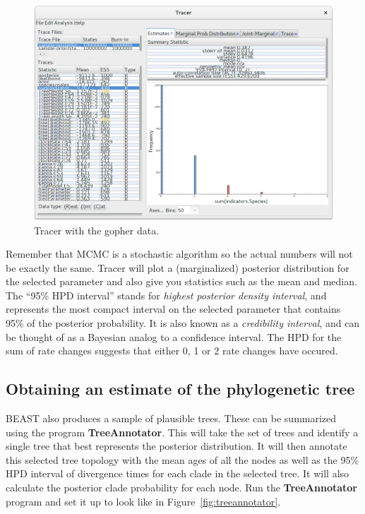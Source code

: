 \documentclass{article}
\begin{document}
\begin{figure}[htb!]
\centering
\includegraphics[width=\textwidth]{figures/tracer-posterior.png}
\caption{Tracer with the gopher data.}
\label{fig:tracer}
\end{figure}

Remember that MCMC is a stochastic algorithm so the actual numbers will not be
exactly the same. Tracer will plot a (marginalized) posterior distribution for
the selected parameter and also give you statistics such as the mean and median.
The ``95\% HPD interval'' stands for \textit{highest posterior density
interval}, and represents the most compact interval on the selected parameter
that contains 95\% of the posterior probability. It is also known as a
\textit{credibility interval}, and can be thought of as a Bayesian analog to a
confidence interval. The HPD for the sum of rate changes suggests that either 0,
1 or 2 rate changes have occured.

\subsection*{Obtaining an estimate of the phylogenetic tree}

BEAST also produces a sample of plausible trees. These can be summarized using
the program \textbf{TreeAnnotator}. This will take the set of trees and identify
a single tree that best represents the posterior distribution. It will then
annotate this selected tree topology with the mean ages of all the nodes as well
as the 95\% HPD interval of divergence times for each clade in the selected
tree. It will also calculate the posterior clade probability for each node. Run
the \textbf{TreeAnnotator} program and set it up to look like in
Figure~\ref{fig:treeannotator}.
\end{document}
